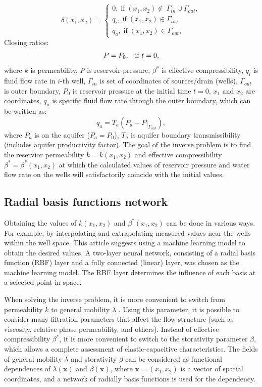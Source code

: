 \documentclass[
11pt,%
tightenlines,%
twoside,%
onecolumn,%
nofloats,%
nobibnotes,%
nofootinbib,%
superscriptaddress,%
noshowpacs,%
centertags]%
{revtex4}
\begin{document}
\begin{equation} \label{bc}
	\delta(x_1,x_2)  = \left\{\begin{array}{crl}
		0, \;\mbox{if}\;(x_1,x_2) \notin\ \Gamma_{in}\cup\Gamma_{out},\\
		q_{i}, \;\mbox{if}\;(x_1,x_2) \in \Gamma_{in},\\
		q_{a}, \;\mbox{if}\;(x_1,x_2) \in \Gamma_{out},
	\end{array}\right. 
\end{equation}
Closing ratios:
\begin{equation} \label{kr}
	P = P_0\mbox{,\quad \mbox{if} $t=0$},
\end{equation}
where $k$ is permeability, $P$ is reservoir pressure, $\beta^*$ is
effective compressibility, $q_i$ is fluid flow rate in $i$-th well, $\Gamma_{in}$
is set of coordinates of sources/drain (wells), $\Gamma_{out}$ is
outer boundary, $P_0$ is reservoir pressure at the initial time $t=0$, $x_1$ and $x_2$ are coordinates, $q_{a}$ is specific fluid flow rate through the outer boundary, which can be written as:
\begin{equation*} \label{qaq}
	q_a = T_{a}(P_{a} - P|_{\Gamma_{out}}),
\end{equation*}
where $P_a$ is on the aquifer ($P_a = P_0$), $T_a$ is
aquifer boundary transmissibility (includes aquifer productivity factor). The goal of the inverse problem is to find the reservior permeability $k = k(x_1,x_2)$ and effective compressibility $\beta^* = \beta^*(x_1,x_2)$ at which the calculated values of reservoir pressure and water flow rate on the wells will satisfactorily coincide with the initial values.

\subsection{Radial basis functions network}

Obtaining the values of $k(x_1,x_2)$ and $\beta^*(x_1,x_2)$ can be done in various ways. For example, by interpolating and extrapolating measured values near the wells within the well space. This article suggests using a machine learning model to obtain the desired values. A two-layer neural network, consisting of a radial basis function (RBF) layer and a fully connected (linear) layer, was chosen as the machine learning model. The RBF layer determines the influence of each basis at a selected point in space.

When solving the inverse problem, it is more convenient to switch from permeability $k$ to general mobility $\lambda$ \cite{abd}. Using this parameter, it is possible to consider many filtration parameters that affect the flow structure (such as viscosity, relative phase permeability, and others). Instead of effective compressibility $\beta^*$, it is more convenient to switch to the storativity parameter $\beta$, which allows a complete assessment of elastic-capacitive characteristics. The fields of general mobility $\lambda$ and storativity $\beta$ can be considered as functional dependences of $\lambda(\mathbf{x})$ and $\beta(\mathbf{x})$, where $\mathbf{x} = (x_1,x_2)$ is a vector of spatial coordinates, and a network of radially basis functions is used for the dependency.
\end{document}

